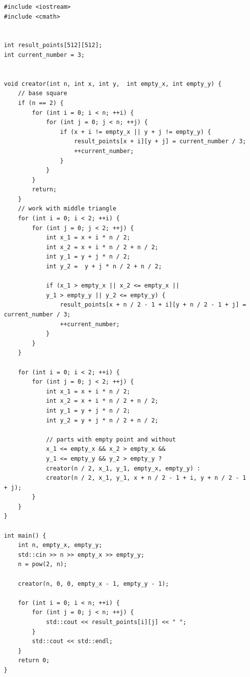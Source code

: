 \documentclass[a5paper, 10pt]{article}
\theoremstyle{definition}
\theoremstyle{plain}
\theoremstyle{remark}
\begin{document}
\begin{center}
\begin{lstlisting}[label=some-code,caption={Исходный код для 1401}]
#include <iostream>
#include <cmath>


int result_points[512][512];
int current_number = 3;


void creator(int n, int x, int y,  int empty_x, int empty_y) {
    // base square
    if (n == 2) {
        for (int i = 0; i < n; ++i) {
            for (int j = 0; j < n; ++j) {
                if (x + i != empty_x || y + j != empty_y) {
                    result_points[x + i][y + j] = current_number / 3;
                    ++current_number;
                }
            }
        }
        return;
    }
    // work with middle triangle
    for (int i = 0; i < 2; ++i) {
        for (int j = 0; j < 2; ++j) {
            int x_1 = x + i * n / 2;
            int x_2 = x + i * n / 2 + n / 2;
            int y_1 = y + j * n / 2;
            int y_2 =  y + j * n / 2 + n / 2;
            
            if (x_1 > empty_x || x_2 <= empty_x ||
            y_1 > empty_y || y_2 <= empty_y) {
                result_points[x + n / 2 - 1 + i][y + n / 2 - 1 + j] = current_number / 3;
                ++current_number;
            }
        }
    }

    for (int i = 0; i < 2; ++i) {
        for (int j = 0; j < 2; ++j) {
            int x_1 = x + i * n / 2;
            int x_2 = x + i * n / 2 + n / 2;
            int y_1 = y + j * n / 2;
            int y_2 = y + j * n / 2 + n / 2;

            // parts with empty point and without
            x_1 <= empty_x && x_2 > empty_x &&
            y_1 <= empty_y && y_2 > empty_y ?
            creator(n / 2, x_1, y_1, empty_x, empty_y) :
            creator(n / 2, x_1, y_1, x + n / 2 - 1 + i, y + n / 2 - 1 + j);
        }
    }
}

int main() {
    int n, empty_x, empty_y;
    std::cin >> n >> empty_x >> empty_y;
    n = pow(2, n);

    creator(n, 0, 0, empty_x - 1, empty_y - 1);

    for (int i = 0; i < n; ++i) {
        for (int j = 0; j < n; ++j) {
            std::cout << result_points[i][j] << " ";
        }
        std::cout << std::endl;
    }
    return 0;
}

\end{lstlisting}
\end{center}
\end{document}
